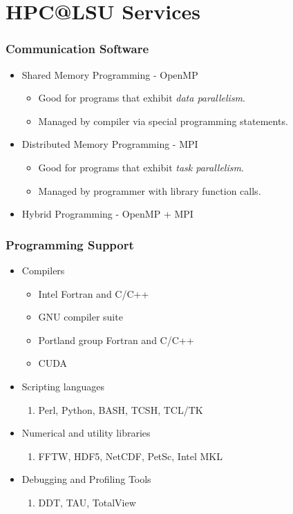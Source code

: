 \documentclass[slidestop,mathserif,compress,xcolor=svgnames,table]{beamer}
\newcommand*\vardiamond{\textcolor{tigerspurple}{%
  \ensuremath{\blacklozenge}}}
\begin{document}
\section{HPC@LSU Services}
\begin{frame}
  \frametitle{\small Communication Software}
  \begin{itemize}
    \item Shared Memory Programming - OpenMP
    \begin{itemize}
      \item[$\vardiamond$] Good for programs that exhibit \textit{data parallelism}.
      \item[$\vardiamond$] Managed by compiler via special programming statements.
    \end{itemize}
    \item Distributed Memory Programming - MPI
    \begin{itemize}
      \item[$\vardiamond$] Good for programs that exhibit \textit{task parallelism}.
      \item[$\vardiamond$] Managed by programmer with library function calls.
    \end{itemize}
    \item Hybrid Programming - OpenMP + MPI
  \end{itemize}
\end{frame}

\begin{frame}
  \frametitle{\small Programming Support}
  \begin{itemize}
    \item Compilers
    \begin{itemize}
      \item[$\vardiamond$] Intel Fortran and C/C++
      \item[$\vardiamond$] GNU compiler suite
      \item[$\vardiamond$] Portland group Fortran and C/C++
      \item[$\vardiamond$] CUDA 
    \end{itemize}
    \item Scripting languages
      \begin{enumerate}
        \item[$\vardiamond$] Perl, Python, BASH, TCSH, TCL/TK
      \end{enumerate}
    \item Numerical and utility libraries
      \begin{enumerate}
        \item[$\vardiamond$] FFTW, HDF5, NetCDF, PetSc, Intel MKL
      \end{enumerate}
    \item Debugging and Profiling Tools
      \begin{enumerate}
        \item[$\vardiamond$] DDT, TAU, TotalView
      \end{enumerate}
  \end{itemize}
\end{frame}
\end{document}
